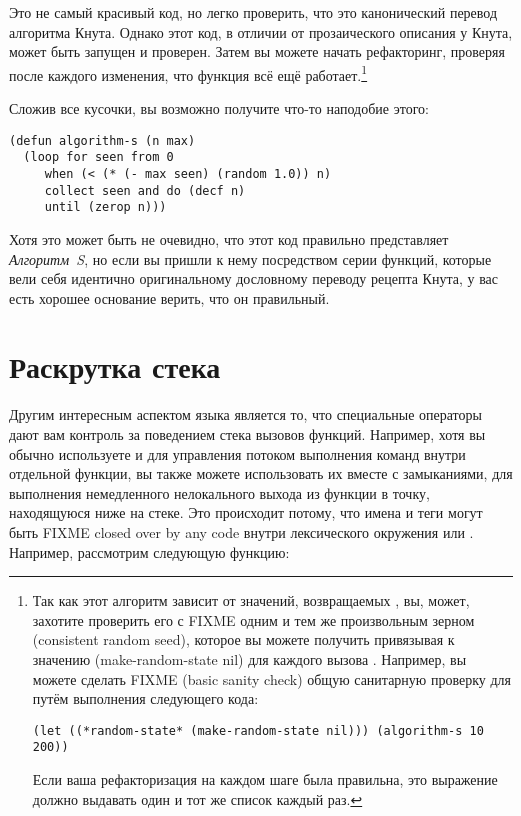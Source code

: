 Это не самый красивый код, но легко проверить, что это канонический перевод алгоритма
Кнута. Однако этот код, в отличии от прозаического описания у Кнута, может быть запущен и
проверен. Затем вы можете начать рефакторинг, проверяя после каждого изменения, что
функция всё ещё работает.\footnote{Так как этот алгоритм зависит от значений, возвращаемых
  , вы, может, захотите проверить его с FIXME одним и тем же произвольным
  зерном (consistent random seed), которое вы можете получить привязывая
   к значению (make-random-state nil) для каждого вызова
  . Например, вы можете сделать FIXME (basic sanity check) общую
  санитарную проверку для  путём выполнения следующего кода:

\begin{lstlisting}
(let ((*random-state* (make-random-state nil))) (algorithm-s 10 200))
\end{lstlisting}

Если ваша рефакторизация на каждом шаге была правильна, это выражение должно выдавать один
и тот же список каждый раз.}

Сложив все кусочки, вы возможно получите что-то наподобие этого:

\begin{lstlisting}
(defun algorithm-s (n max)
  (loop for seen from 0
     when (< (* (- max seen) (random 1.0)) n)
     collect seen and do (decf n)
     until (zerop n)))
\end{lstlisting}

Хотя это может быть не очевидно, что этот код правильно представляет \textit{Алгоритм~S},
но если вы пришли к нему посредством серии функций, которые вели себя идентично
оригинальному дословному переводу рецепта Кнута, у вас есть хорошее основание верить, что
он правильный.

\section{Раскрутка стека}

Другим интересным аспектом языка является то, что специальные операторы дают вам контроль
за поведением стека вызовов функций. Например, хотя вы обычно используете  и
 для управления потоком выполнения команд внутри отдельной функции, вы также
можете использовать их вместе с замыканиями, для выполнения немедленного нелокального
выхода из функции в точку, находящуюся ниже на стеке. Это происходит потому, что имена
 и теги  могут быть FIXME closed over by any code внутри
лексического окружения  или . Например, рассмотрим следующую
функцию:

